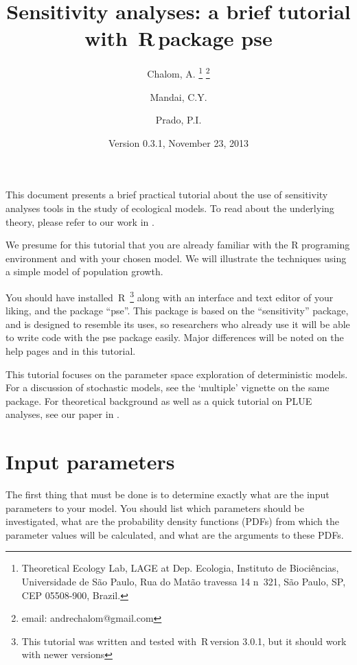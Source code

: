 \documentclass[12pt,a4paper]{article}
\newcommand{\R}{{\sf \,R\,}} %
\begin{document}



\title{Sensitivity analyses: a brief tutorial with \R package pse}
\author{Chalom, A. \footnote{Theoretical Ecology Lab, LAGE at  Dep. Ecologia, Instituto de Biociências, Universidade de São Paulo,
Rua do Matão travessa 14 n\textordmasculine \ 321, São Paulo, SP, CEP 05508-900, Brazil.}
\footnote{email: andrechalom@gmail.com} 
\and
Mandai, C.Y. \footnotemark[1] \and  Prado, P.I. \footnotemark[1]}
\date{Version 0.3.1, November 23, 2013} 
\maketitle

This document presents a brief practical tutorial about the use of
sensitivity analyses tools in the study of ecological models. To 
read about the underlying theory, please refer to our work in \cite{Chalom12}.

We presume for this tutorial that you are already familiar with the
R programing environment and with your chosen model. We will illustrate
the techniques using a simple model of population growth.

You should have installed \R 
\footnote{This tutorial was written and tested with \R version 
3.0.1, but it should work with newer versions}
along with an interface and 
text editor of your liking, and the package ``pse''. This package is based
on the ``sensitivity'' package, and is designed to resemble its uses, so
researchers who already use it will be able to write code with the pse
package easily. Major differences will be noted on the help pages and
in this tutorial.

This tutorial focuses on the parameter space exploration of deterministic 
models. For a discussion of stochastic models, see the `multiple' vignette 
on the same package. For theoretical background as well as a quick tutorial on
PLUE analyses, see our paper in \cite{Chalom15}.


\section{Input parameters}
The first thing that must be done is to determine exactly what are
the input parameters to your model. You should list which parameters
should be investigated, what are the probability density functions (PDFs)
from which the parameter values will be calculated, and what are
the arguments to these PDFs.
\end{document}
